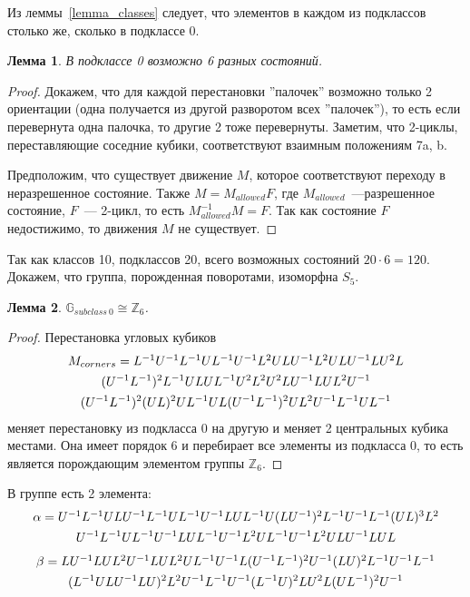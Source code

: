\documentclass[utf8,a4paper,draft]{article}
\newtheorem{lemma_cub}{Лемма}[section]
\begin{document}
Из леммы~\ref{lemma_classes} следует, что элементов в каждом из подклассов столько же, сколько в подклассе 0.
\begin{lemma_cub}
В подклассе 0 возможно 6 разных состояний.
\end{lemma_cub}
\begin{proof}
Докажем, что для каждой перестановки ''палочек'' возможно только 2 ориентации (одна получается из другой разворотом всех ''палочек''), то есть если перевернута одна палочка, то другие 2 тоже перевернуты.
Заметим, что 2-циклы, переставляющие соседние кубики, соответствуют взаимным положениям 7a, b.

Предположим, что существует движение $M$, которое соответствуют переходу в неразрешенное состояние. Также $M=M_{allowed}F$, где $M_{allowed}$~---разрешенное состояние, $F$~--- 2-цикл, то есть $M_{allowed}^{-1}M=F$. Так как состояние $F$ недостижимо, то движения $M$ не существует.
\end{proof}
Так как классов 10, подклассов 20, всего возможных состояний $20\cdot 6=120$.
Докажем, что группа, порожденная поворотами, изоморфна $S_5$.
\begin{lemma_cub}
\label{lemma4}
$\mathbb{G}_{subclass~0} \cong \mathbb{Z}_6$.
\end{lemma_cub}
\begin{proof}
Перестановка угловых кубиков
\begin{multline*}
$$
M_{corners}=L^{-1}U^{-1}L^{-1}UL^{-1}U^{-1}L^2ULU^{-1}L^2ULU^{-1}LU^2L \\
	(U^{-1}L^{-1})^2L^{-1}ULUL^{-1}U^2L^2U^2LU^{-1}LUL^2U^{-1} \\
		(U^{-1}L^{-1})^2(UL)^2UL^{-1}UL(U^{-1}L^{-1})^2UL^2U^{-1}L^{-1}UL^{-1}
$$
\end{multline*}
меняет перестановку из подкласса 0 на другую и меняет 2 центральных кубика местами. Она имеет порядок 6 и перебирает все элементы из подкласса 0, то есть является порождающим элементом группы $\mathbb{Z}_6$.
\end{proof}
В группе есть 2 элемента:
\begin{multline*} %
$$
\alpha=U^{-1}L^{-1}ULU^{-1}L^{-1}UL^{-1}U^{-1}LUL^{-1}U(LU^{-1})^2L^{-1}U^{-1}L^{-1}(UL)^3L^2 \\
	U^{-1}L^{-1}UL^{-1}U^{-1}LUL^{-1}U^{-1}L^2UL^{-1}U^{-1}L^2ULU^{-1}LUL
$$
\end{multline*}
\begin{multline*} %
$$
\beta=LU^{-1}LUL^2U^{-1}LUL^2UL^{-1}U^{-1}L(U^{-1}L^{-1})^2U^{-1}(LU)^2L^{-1}U^{-1}L^{-1}\\ 
		(L^{-1}ULU^{-1}LU)^2L^2U^{-1}L^{-1}U^{-1}(L^{-1}U)^2LU^2L(UL^{-1})^2U^{-1}
$$
\end{multline*}
\end{document}
